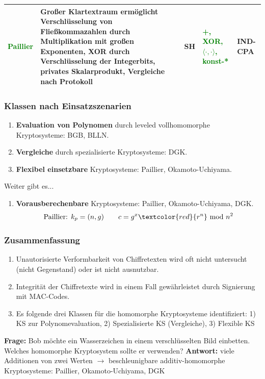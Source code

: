\documentclass[handout,usenames,dvipsnames]{beamer}
\newcounter{sauvegardeenumi}
\newcommand{\asuivre}{\setcounter{sauvegardeenumi}{\theenumi}}
\newcommand{\suite}{\setcounter{enumi}{\thesauvegardeenumi}}
\begin{document}
\begin{frame}
\begin{tabu}{ | l |p{3cm} | l | p{1cm} | l |}
		\textcolor{green}{Paillier} \newline\cite{paillier1999public}
		& Großer Klartextraum ermöglicht Verschlüsselung von Fließkommazahlen durch Multiplikation mit großen Exponenten,
		\newline XOR durch Verschlüsselung der Integerbits,
		\newline privates Skalarprodukt,
		\newline Vergleiche nach Protokoll \cite{veugen2011comparing}
		& SH 
		& \textcolor{green}{+,  \newline XOR, \newline $\langle\cdot,\cdot\rangle$, \newline konst-*}
		& IND-CPA \\ \hline
	\end{tabu}
\end{frame}

\begin{frame}
	\frametitle{Klassen nach Einsatzszenarien}
	\begin{enumerate}
		\item \textbf{Evaluation von Polynomen} durch leveled vollhomomorphe Kryptosysteme: BGB, BLLN.
		\item  \textbf{Vergleiche} durch spezialisierte Kryptosysteme: DGK. 
		\item \textbf{Flexibel einsetzbare} Kryptosysteme: Paillier, Okamoto-Uchiyama.
		\asuivre 
	\end{enumerate}
	Weiter gibt es...
	\begin{enumerate}
		\suite
		\item \textbf{Vorausberechenbare} Kryptosysteme: Paillier, Okamoto-Uchiyama, DGK.
		\begin{equation*}
			\text{Paillier: }k_p = (n,g) \qquad c = g^x \textcolor{red}{r^n}\ \text{mod}\ n^2
		\end{equation*}
	\end{enumerate}
\end{frame}

\begin{frame}
	\frametitle{Zusammenfassung}
	\begin{enumerate}
		\item Unautorisierte Verformbarkeit von Chiffretexten wird oft nicht untersucht (nicht Gegenstand) oder ist nicht ausnutzbar.
		\item Integrität der Chiffretexte wird in einem Fall gewährleistet durch Signierung mit MAC-Codes.
		\item Es folgende drei Klassen für die homomorphe Kryptosysteme identifiziert: 1) KS zur Polynomevaluation, 2) Spezialisierte KS (Vergleiche), 3) Flexible KS
	\end{enumerate}

\textbf{Frage:} Bob möchte ein Wasserzeichen in einem verschlüsselten Bild einbetten. Welches homomorphe Kryptosystem sollte er verwenden? \newline
\textbf{Antwort:} viele Additionen von zwei Werten $\rightarrow$ beschleunigbare additiv-homomorphe Kryptosysteme: Paillier, Okamoto-Uchiyama, DGK
\end{frame}
\end{document}
